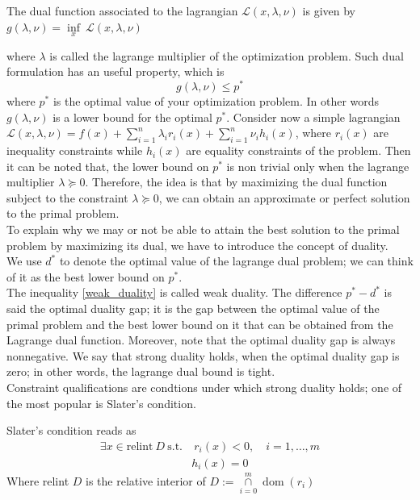 \begin{definition}
    The dual function associated to the lagrangian $\mathcal{L}(x,\lambda, \nu)$ is given by $g(\lambda, \nu)=\underset{x}\inf \ \mathcal{L}(x,\lambda, \nu)$
\end{definition}
where $\lambda$ is called the lagrange multiplier of the optimization problem. Such dual formulation has an useful property, which is \begin{equation}\label{weak_duality}
    g(\lambda, \nu)\leq p^*
\end{equation}
where $p^*$ is the optimal value of your optimization problem. In other words $g(\lambda, \nu)$ is a lower bound for the optimal $p^*$.
Consider now a simple lagrangian $\mathcal{L}(x,\lambda, \nu)=f(x)+\sum\limits_{i=1}^n \lambda_i r_i(x) +\sum\limits_{i=1}^{n} \nu_i h_i(x)$, where $r_i(x)$ are inequality constraints while $h_i(x)$ are equality constraints of the problem. Then it can be noted that, the lower bound on $p^*$ is non trivial only when the lagrange multiplier $\lambda \succeq 0$.
Therefore, the idea is that by maximizing the dual function subject to the constraint $\lambda \succeq 0$, we can obtain an approximate or perfect solution to the primal problem.
\\
To explain why we may or not be able to attain the best solution to the primal problem by maximizing its dual, we have to introduce the concept of duality.
\\
We use $d^*$ to denote the optimal value of the lagrange dual problem; we can think of it as the best lower bound on $p^*$. 
\\
The inequality \ref{weak_duality} is called weak duality. The difference $p^*-d^*$ is said the optimal duality gap; it is the gap between the optimal value of the primal problem and the best lower bound on it that can be obtained from the Lagrange dual function. Moreover, note that the optimal duality gap is always nonnegative.
We say that strong duality holds, when the optimal duality gap is zero; in other words, the lagrange dual bound is tight.
\\
Constraint qualifications are condtions under which strong duality holds; one of the most popular is Slater's condition.
\begin{proposition}
    Slater's condition reads as
    \begin{equation}\label{slater_condition}
        \begin{aligned}
            \exists x \in \textrm{relint} \ D \ \textrm{s.t.} & \ r_i(x)<0, \quad i=1, \dots, m \\
            & h_i(x)=0
        \end{aligned}
    \end{equation}
    Where relint $D$ is the relative interior of $ D:=\underset{i=0}{\overset{m}{\cap}} \operatorname {dom} (r_{i})$
\end{proposition}
